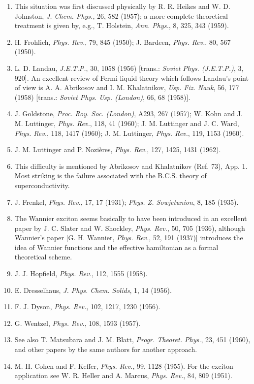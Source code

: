 \begin{enumerate}[label=(\arabic*),leftmargin=2.8em,itemsep=1pt,parsep=0pt]
\item This situation was first discussed physically by R. R. Heikes and W. D. Johnston, \emph{J. Chem. Phys.}, 26, 582 (1957); a more complete theoretical treatment is given by, e.g., T. Holstein, \emph{Ann. Phys.}, 8, 325, 343 (1959).
\item H. Frohlich, \emph{Phys. Rev.}, 79, 845 (1950); J. Bardeen, \emph{Phys. Rev.}, 80, 567 (1950).
\item L. D. Landau, \emph{J.E.T.P.}, 30, 1058 (1956) [trans.: \emph{Soviet Phys. (J.E.T.P.)}, 3, 920]. An excellent review of Fermi liquid theory which follows Landau's point of view is A. A. Abrikosov and I. M. Khalatnikov, \emph{Usp. Fiz. Nauk}, 56, 177 (1958) [trans.: \emph{Soviet Phys. Usp. (London)}, 66, 68 (1958)].
\item J. Goldstone, \emph{Proc. Roy. Soc. (London)}, A293, 267 (1957); W. Kohn and J. M. Luttinger, \emph{Phys. Rev.}, 118, 41 (1960); J. M. Luttinger and J. C. Ward, \emph{Phys. Rev.}, 118, 1417 (1960); J. M. Luttinger, \emph{Phys. Rev.}, 119, 1153 (1960).
\item J. M. Luttinger and P. Nozi\`eres, \emph{Phys. Rev.}, 127, 1425, 1431 (1962).
\item This difficulty is mentioned by Abrikosov and Khalatnikov (Ref. 73), App. 1. Most striking is the failure associated with the B.C.S. theory of superconductivity.
\item J. Frenkel, \emph{Phys. Rev.}, 17, 17 (1931); \emph{Phys. Z. Sowjetunion}, 8, 185 (1935).
\item The Wannier exciton seems basically to have been introduced in an excellent paper by J. C. Slater and W. Shockley, \emph{Phys. Rev.}, 50, 705 (1936), although Wannier's paper [G. H. Wannier, \emph{Phys. Rev.}, 52, 191 (1937)] introduces the idea of Wannier functions and the effective hamiltonian as a formal theoretical scheme.
\item J. J. Hopfield, \emph{Phys. Rev.}, 112, 1555 (1958).
\item E. Dresselhaus, \emph{J. Phys. Chem. Solids}, 1, 14 (1956).
\item F. J. Dyson, \emph{Phys. Rev.}, 102, 1217, 1230 (1956).
\item G. Wentzel, \emph{Phys. Rev.}, 108, 1593 (1957).
\item See also T. Matsubara and J. M. Blatt, \emph{Progr. Theoret. Phys.}, 23, 451 (1960), and other papers by the same authors for another approach.
\item M. H. Cohen and F. Keffer, \emph{Phys. Rev.}, 99, 1128 (1955). For the exciton application see W. R. Heller and A. Marcus, \emph{Phys. Rev.}, 84, 809 (1951).

\end{enumerate}
